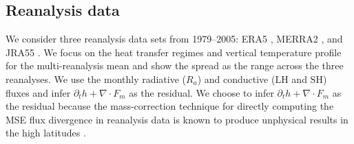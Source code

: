 \documentclass{ametsocV5}
\begin{document}
    \subsection{Reanalysis data}\label{subsec:reanalysis}
    
    We consider three reanalysis data sets from 1979--2005: ERA5 \citep{hersbach2020}, MERRA2 \citep{gelaro2017}, and JRA55 \citep{kobayashi2015}. We focus on the heat transfer regimes and vertical temperature profile for the multi-reanalysis mean and show the spread as the range across the three reanalyses. We use the monthly radiative ($R_a$) and conductive ($\mathrm{LH}$ and $\mathrm{SH}$) fluxes and infer $\partial_t h + \nabla\cdot F_m$ as the residual. We choose to infer $\partial_t h +\nabla\cdot F_m$ as the residual because the mass-correction technique for directly computing the MSE flux divergence in reanalysis data is known to produce unphysical results in the high latitudes \citep{porter2010}. 
    

    
    
\end{document}
